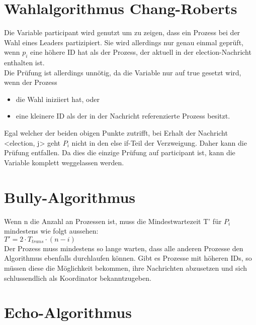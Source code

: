 \documentclass[a4paper,9pt]{article}
\begin{document}
\section{Wahlalgorithmus Chang-Roberts}
Die Variable participant wird genutzt um zu zeigen, dass ein Prozess bei der Wahl eines Leaders partizipiert. Sie wird allerdings nur genau einmal gepr\"uft, wenn $p_{i}$ eine h\"ohere ID hat als der Prozess, der aktuell in der election-Nachricht enthalten ist. \\
Die Pr\"ufung ist allerdings unn\"otig, da die Variable nur auf true gesetzt wird, wenn der Prozess
\begin{itemize}
\item die Wahl iniziiert hat, oder
\item eine kleinere ID als der in der Nachricht referenzierte Prozess besitzt.
\end{itemize}
Egal welcher der beiden obigen Punkte zutrifft, bei Erhalt der Nachricht \\
<election, j> geht $P_{i}$ nicht in den else if-Teil der Verzweigung. Daher kann die Pr\"ufung entfallen. Da dies die einzige Pr\"ufung auf participant ist, kann die Variable komplett weggelassen werden.

\section{Bully-Algorithmus}
Wenn n die Anzahl an Prozessen ist, muss die Mindestwartezeit T' f\"ur $P_{i}$ mindestens wie folgt aussehen: \\
$T' = 2 \cdot T_{trans} \cdot (n-i)$ \\
Der Prozess muss mindestens so lange warten, dass alle anderen Prozesse den Algorithmus ebenfalls durchlaufen k\"onnen. Gibt es Prozesse mit h\"oheren IDs, so m\"ussen diese die M\"oglichkeit bekommen, ihre Nachrichten abzusetzen und sich schlussendlich als Koordinator bekanntzugeben.

\section{Echo-Algorithmus}
\end{document}
